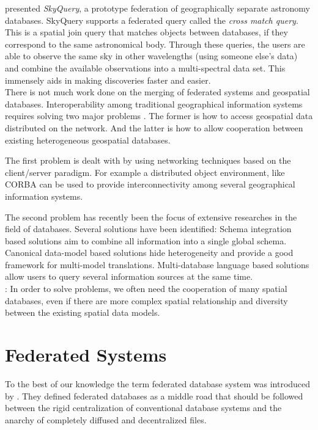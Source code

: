\documentclass[12pt,a4paper]{report}
\newcommand{\term}{\textit}
\begin{document}
	\citet{Malik} presented \term{SkyQuery}, a prototype federation of 
	geographically separate astronomy databases. SkyQuery supports a federated 
	query called the \term{cross match query}. This is a spatial join query 
	that matches objects between databases, if they correspond to the same 
	astronomical body. Through these queries, the users are able to observe the 
	same sky in other wavelengths (using someone else’s data) and combine the 
	available observations into a multi-spectral data set. This immensely aids 
	in making discoveries faster and easier.
	\\

	There is not much work done on the merging of federated systems and geospatial databases.
	Interoperability among traditional geographical information systems requires solving two major problems \citep{Gong}. The former is how to access geospatial data distributed on the network. And the latter is how to allow cooperation between existing heterogeneous geospatial databases.
	\par
	The first problem is dealt with by using networking techniques based on the client/server paradigm. For example a distributed object environment, like CORBA can be used to provide interconnectivity among several geographical information systems.
	\par
	The second problem has recently been the focus of extensive researches in the field of databases. Several solutions have been identified: Schema integration based solutions aim to combine all information into a single global schema. Canonical data-model based solutions hide heterogeneity and provide a good framework for multi-model translations. Multi-database language based solutions allow users to query several information sources at the same time.
	\\ 

	\citep{Gong}: In order to solve problems, we often need the cooperation of many spatial databases, even if there are more complex spatial relationship and diversity between the existing spatial data models.
	\\



	\chapter{Federated Systems}
	\label{sec:fed_sys}
	
	To the best of our knowledge the term federated database system was 
	introduced by \citet{Hammer}. They defined federated databases as a middle 
	road that should be followed between the rigid centralization of 
	conventional database systems and the anarchy of completely diffused and 
	decentralized files.
	\\
\end{document}
